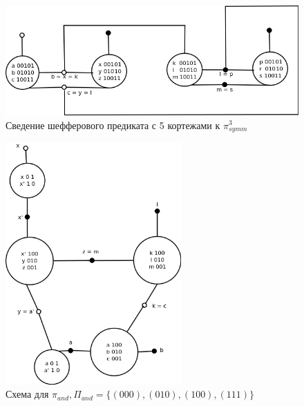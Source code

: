 \documentclass[12pt]{extarticle}
\begin{document}
\begin{figure}[htb]
 \centering
\includegraphics[width=1.0\textwidth]{sch5.png}
\caption{Сведение шефферового предиката с 5 кортежами к $\pi_{symm}^3$ }
\label{fig:sheff5tosheff3}
\end{figure}



\begin{figure}[htb]
\centering
\includegraphics[width=0.6\textwidth]{min_and.png}
\caption{Схема для $\pi_{and}, \Pi_{and} = \{ (000), (010), (100), (111) \}$}
\label{fig:and}
\end{figure}
\end{document}
